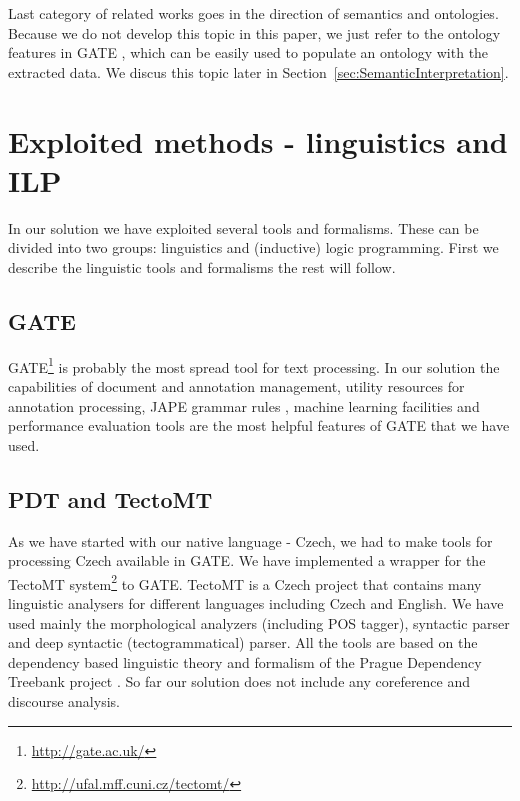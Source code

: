 \documentclass[runningheads,a4paper]{llncs}
\begin{document}
Last category of related works goes in the direction of semantics and ontologies. Because we do not develop this topic in this paper, we just refer to the ontology features in GATE \cite{Bon04b}, which can be easily used to populate an ontology with the extracted data. We discus this topic later in Section~\ref{sec:SemanticInterpretation}.




\section{Exploited methods - linguistics and ILP}
In our solution we have exploited several tools and formalisms. These can be divided into two groups: linguistics and (inductive) logic programming. First we describe the linguistic tools and formalisms the rest will follow.

\subsection{GATE}
GATE\footnote{\url{http://gate.ac.uk/}} is probably the most spread tool for text processing. In our solution the capabilities of document and annotation management, utility resources for annotation processing, JAPE grammar rules \cite{Cunningham00jape:a}, machine learning facilities and performance evaluation tools are the most helpful features of GATE that we have used.

\subsection{PDT and TectoMT}
As we have started with our native language - Czech, we had to make tools for processing Czech available in GATE. We have implemented a wrapper for the TectoMT system\footnote{\url{http://ufal.mff.cuni.cz/tectomt/}} \cite{dedek:ZaPtTectoMTHighly2008} to GATE. TectoMT is a Czech project that contains many linguistic analysers for different languages including Czech and English. We have used mainly the morphological analyzers (including POS tagger), syntactic parser and deep syntactic (tectogrammatical) parser. All the tools are based on the dependency based linguistic theory and formalism of the Prague Dependency Treebank project \cite{dedek:PDT20_CD}. So far our solution does not include any coreference and discourse analysis.
\end{document}
